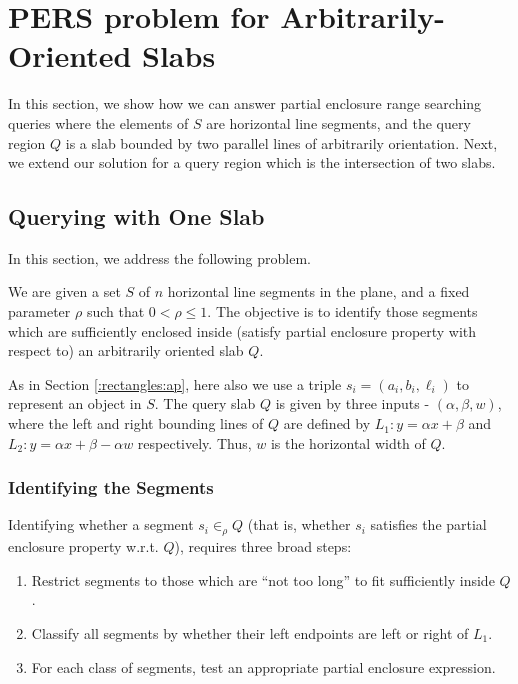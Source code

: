 \section{PERS problem for Arbitrarily-Oriented Slabs}
\label{:slabs}

In this section, we show how we can answer partial enclosure range searching 
queries
where the elements of $S$ are horizontal line segments, and the query region 
$Q$ 
is a slab bounded by two parallel lines of arbitrarily orientation. Next, we 
extend 
our solution for a query region which is the intersection of two slabs. 

\subsection{Querying with One Slab}
\label{:slabs:one}
In this section, we address the following problem. 
\begin{problem}
We are given a set $S$ of $n$ horizontal line segments in the 
plane, and a fixed parameter $\rho$ such that $0 < \rho \leq 1$. 
The objective is to identify those segments which are sufficiently 
enclosed inside (satisfy partial enclosure property with respect 
to) an arbitrarily oriented slab $Q$.
\end{problem}

As in Section \ref{:rectangles:ap}, here also we use a triple 
$s_i=(a_i,b_i,\ell_i)$ to represent an object in $S$. The 
query slab $Q$ is given by three inputs - $(\alpha, \beta, w)$,  
where the left and right bounding lines of $Q$ are defined by 
$L_1 : y = \alpha x + \beta$ and $L_2: y = \alpha x + \beta - 
\alpha w$ respectively. Thus, $w$ is the horizontal width of $Q$.

\subsubsection{Identifying the Segments}
\label{:slabs:one:approach}
Identifying whether a segment $s_i \in_\rho Q$ (that is, whether $s_i$ satisfies the partial 
enclosure property w.r.t. $Q$), requires three broad steps:

\begin{enumerate}
\item Restrict segments to those which are ``not too long'' to fit 
sufficiently inside $Q$.
\item Classify all segments by whether their left endpoints are 
left or right of $L_1$.
\item For each class of segments, test an appropriate partial 
enclosure expression.
\end{enumerate}

